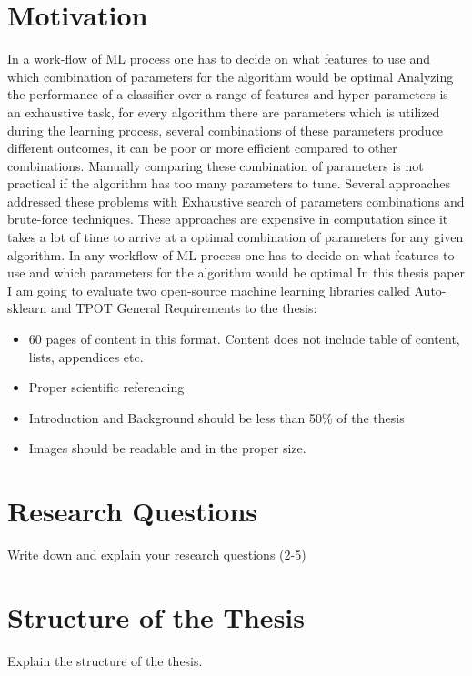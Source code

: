 \section{Motivation}
In a work-flow of ML process one has to decide on what features to use and which combination of parameters for the algorithm would be optimal 
Analyzing the performance of a classifier over a range of features and hyper-parameters is an exhaustive task, for every algorithm there are parameters  which is utilized during the learning process, several combinations of these parameters produce different outcomes, it can be poor or more efficient compared to other combinations. Manually comparing these combination of parameters is not practical if the algorithm has too many parameters to tune. Several approaches addressed these problems with Exhaustive search of parameters combinations and brute-force techniques. These approaches are expensive in computation since it takes a lot of time to arrive at a optimal combination of parameters for any given algorithm. In any workflow of ML process one has to decide on what features to use and which parameters for the algorithm would be optimal 
In this thesis paper I am going to evaluate two open-source machine learning libraries called Auto-sklearn\cite{autosklearn} and TPOT\cite{tpot}
General Requirements to the thesis:

\begin{itemize}
	\item 60 pages of content in this format. Content does not include table of content, lists, appendices etc.
	\item Proper scientific referencing
	\item Introduction and Background should be less than 50\% of the thesis
	\item Images should be readable and in the proper size. 
\end{itemize}


\section{Research Questions}

Write down and explain your research questions (2-5)

\section{Structure of the Thesis}

Explain the structure of the thesis. 

